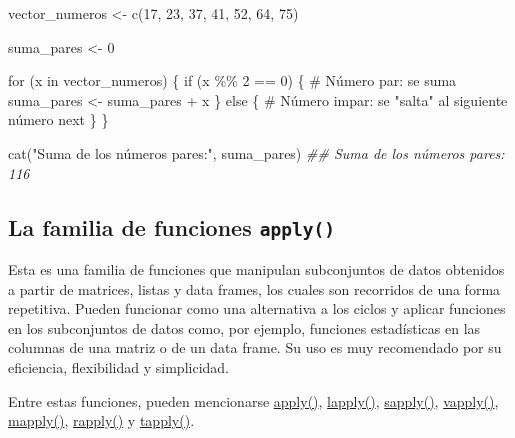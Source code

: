 \documentclass[
  letterpaper,
  DIV=11,
  numbers=noendperiod]{scrreprt}
\newenvironment{Shaded}{\begin{snugshade}}{\end{snugshade}}
\newcommand{\CommentTok}[1]{\textcolor[rgb]{0.37,0.37,0.37}{#1}}
\newcommand{\ControlFlowTok}[1]{\textcolor[rgb]{0.00,0.23,0.31}{#1}}
\newcommand{\DecValTok}[1]{\textcolor[rgb]{0.68,0.00,0.00}{#1}}
\newcommand{\DocumentationTok}[1]{\textcolor[rgb]{0.37,0.37,0.37}{\textit{#1}}}
\newcommand{\FunctionTok}[1]{\textcolor[rgb]{0.28,0.35,0.67}{#1}}
\newcommand{\NormalTok}[1]{\textcolor[rgb]{0.00,0.23,0.31}{#1}}
\newcommand{\OtherTok}[1]{\textcolor[rgb]{0.00,0.23,0.31}{#1}}
\newcommand{\SpecialCharTok}[1]{\textcolor[rgb]{0.37,0.37,0.37}{#1}}
\newcommand{\StringTok}[1]{\textcolor[rgb]{0.13,0.47,0.30}{#1}}
\begin{document}
\begin{Shaded}
\begin{Highlighting}[]
\NormalTok{vector\_numeros }\OtherTok{\textless{}{-}} \FunctionTok{c}\NormalTok{(}\DecValTok{17}\NormalTok{, }\DecValTok{23}\NormalTok{, }\DecValTok{37}\NormalTok{, }\DecValTok{41}\NormalTok{, }\DecValTok{52}\NormalTok{, }\DecValTok{64}\NormalTok{, }\DecValTok{75}\NormalTok{)}

\NormalTok{suma\_pares }\OtherTok{\textless{}{-}} \DecValTok{0}

\ControlFlowTok{for}\NormalTok{ (x }\ControlFlowTok{in}\NormalTok{ vector\_numeros) \{}
  \ControlFlowTok{if}\NormalTok{ (x }\SpecialCharTok{\%\%} \DecValTok{2} \SpecialCharTok{==} \DecValTok{0}\NormalTok{) \{}
    \CommentTok{\# Número par: se suma}
\NormalTok{    suma\_pares }\OtherTok{\textless{}{-}}\NormalTok{ suma\_pares }\SpecialCharTok{+}\NormalTok{ x}
\NormalTok{  \} }\ControlFlowTok{else}\NormalTok{ \{}
    \CommentTok{\# Número impar: se "salta" al siguiente número}
    \ControlFlowTok{next}
\NormalTok{  \}}
\NormalTok{\}}

\FunctionTok{cat}\NormalTok{(}\StringTok{"Suma de los números pares:"}\NormalTok{, suma\_pares)}
\DocumentationTok{\#\# Suma de los números pares: 116}
\end{Highlighting}
\end{Shaded}

\hypertarget{la-familia-de-funciones-apply}{%
\subsection{\texorpdfstring{La familia de funciones
\texttt{apply()}}{La familia de funciones apply()}}\label{la-familia-de-funciones-apply}}

Esta es una familia de funciones que manipulan subconjuntos de datos
obtenidos a partir de matrices, listas y data frames, los cuales son
recorridos de una forma repetitiva. Pueden funcionar como una
alternativa a los ciclos y aplicar funciones en los subconjuntos de
datos como, por ejemplo, funciones estadísticas en las columnas de una
matriz o de un data frame. Su uso es muy recomendado por su eficiencia,
flexibilidad y simplicidad.

Entre estas funciones, pueden mencionarse
\href{https://rdrr.io/r/base/apply.html}{apply()},
\href{https://rdrr.io/r/base/lapply.html}{lapply()},
\href{https://rdrr.io/cran/functools/man/Sapply.html}{sapply()},
\href{https://rdrr.io/cran/functools/man/Vapply.html}{vapply()},
\href{https://rdrr.io/r/base/mapply.html}{mapply()},
\href{https://rdrr.io/r/base/rapply.html}{rapply()} y
\href{https://rdrr.io/r/base/tapply.html}{tapply()}.
\end{document}
